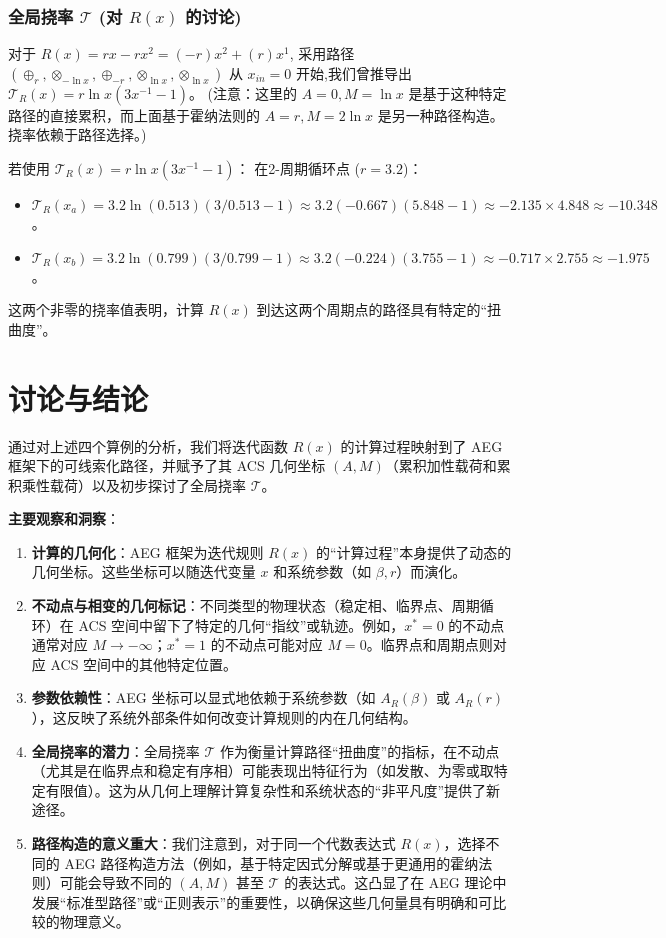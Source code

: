 \documentclass[12pt]{article}
\begin{document}
\subsubsection{全局挠率 $\mathcal{T}$ (对 $R(x)$ 的讨论)}
对于 $R(x) = rx - rx^2 = (-r)x^2 + (r)x^1$, 采用路径 $(\oplus_r, \otimes_{-\ln x}, \oplus_{-r}, \otimes_{\ln x}, \otimes_{\ln x})$ 从 $x_{in}=0$ 开始,我们曾推导出 $\mathcal{T}_R(x) = r \ln x (3x^{-1} - 1)$。
(注意：这里的 $A=0, M=\ln x$ 是基于这种特定路径的直接累积，而上面基于霍纳法则的 $A=r, M=2\ln x$ 是另一种路径构造。挠率依赖于路径选择。)

若使用 $\mathcal{T}_R(x) = r \ln x (3x^{-1} - 1)$：
在2-周期循环点 ($r=3.2$)：
\begin{itemize}
    \item $\mathcal{T}_R(x_a) = 3.2 \ln(0.513) (3/0.513 - 1) \approx 3.2(-0.667)(5.848 - 1) \approx -2.135 \times 4.848 \approx -10.348$。
    \item $\mathcal{T}_R(x_b) = 3.2 \ln(0.799) (3/0.799 - 1) \approx 3.2(-0.224)(3.755 - 1) \approx -0.717 \times 2.755 \approx -1.975$。
\end{itemize}
这两个非零的挠率值表明，计算 $R(x)$ 到达这两个周期点的路径具有特定的“扭曲度”。

\section{讨论与结论}
通过对上述四个算例的分析，我们将迭代函数 $R(x)$ 的计算过程映射到了 AEG 框架下的可线索化路径，并赋予了其 ACS 几何坐标 $(A,M)$（累积加性载荷和累积乘性载荷）以及初步探讨了全局挠率 $\mathcal{T}$。

\textbf{主要观察和洞察}：
\begin{enumerate}
    \item \textbf{计算的几何化}：AEG 框架为迭代规则 $R(x)$ 的“计算过程”本身提供了动态的几何坐标。这些坐标可以随迭代变量 $x$ 和系统参数（如 $\beta, r$）而演化。
    \item \textbf{不动点与相变的几何标记}：不同类型的物理状态（稳定相、临界点、周期循环）在 ACS 空间中留下了特定的几何“指纹”或轨迹。例如，$x^*=0$ 的不动点通常对应 $M \rightarrow -\infty$；$x^*=1$ 的不动点可能对应 $M=0$。临界点和周期点则对应 ACS 空间中的其他特定位置。
    \item \textbf{参数依赖性}：AEG 坐标可以显式地依赖于系统参数（如 $A_R(\beta)$ 或 $A_R(r)$），这反映了系统外部条件如何改变计算规则的内在几何结构。
    \item \textbf{全局挠率的潜力}：全局挠率 $\mathcal{T}$ 作为衡量计算路径“扭曲度”的指标，在不动点（尤其是在临界点和稳定有序相）可能表现出特征行为（如发散、为零或取特定有限值）。这为从几何上理解计算复杂性和系统状态的“非平凡度”提供了新途径。
    \item \textbf{路径构造的意义重大}：我们注意到，对于同一个代数表达式 $R(x)$，选择不同的 AEG 路径构造方法（例如，基于特定因式分解或基于更通用的霍纳法则）可能会导致不同的 $(A,M)$ 甚至 $\mathcal{T}$ 的表达式。这凸显了在 AEG 理论中发展“标准型路径”或“正则表示”的重要性，以确保这些几何量具有明确和可比较的物理意义。
\end{enumerate}
\end{document}
